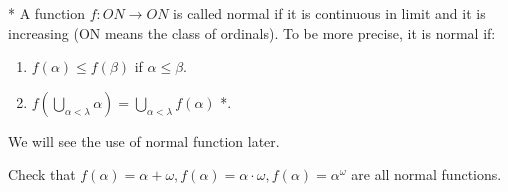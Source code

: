 \begin{definition}{*} A function $f: ON \rightarrow ON$ is called normal
if it is continuous in limit and it is increasing (ON means the class of ordinals).
To be more precise, it is normal if:
\begin{enumerate}
\item $f(\alpha) \le f(\beta)$ if $\alpha \le \beta$.\\
\item $f(\bigcup_{\alpha < \lambda} \alpha) = \bigcup_{\alpha < \lambda}f(\alpha)$ {*}.
\end{enumerate}
\end{definition}
We will see the use of normal function later.
\begin{exercise} Check that $f(\alpha) = \alpha + \omega, f(\alpha) = \alpha \cdot \omega, f(\alpha) = \alpha^\omega$ are all normal functions.
\end{exercise}
